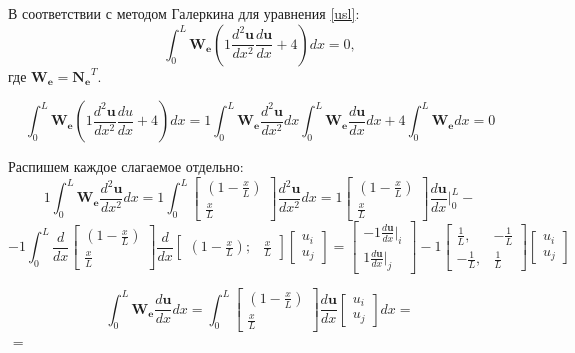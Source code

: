 В соответствии с методом Галеркина для уравнения \ref{usl}:
\begin{equation}\label{lin}
\int_0^L \mathbf{W_e}\left( 1\frac{d^2\mathbf{u}}{dx^2} \frac{d\mathbf{u}}{dx}  +4 \right) d x=0,
\end{equation}
где $\mathbf{W_e=N_e}^T$.

$$\int_0^L \mathbf{W_e}\left(1\frac{d^2\mathbf{u}}{dx^2} \frac{du}{dx}  +4 \right) d x= 1\int_0^L \mathbf{W_e} \frac{d^2 \mathbf{u}}{dx^2} dx   \int_0^L \mathbf{W_e}\frac{d\mathbf{u}}{dx} d x   +4 \int_0^L \mathbf{W_e} d x=0$$

Распишем каждое слагаемое отдельно:
$$
1\int_0^L \mathbf{W_e} \frac{d^2 \mathbf{u}}{dx^2} dx=1\int_0^L
	\begin{bmatrix}
	(1-\frac{x}{L}) \\
	\frac{x}{L}
	\end{bmatrix}
\frac{d^2 \mathbf{u}}{dx^2} dx =
1
	\begin{bmatrix}
	(1-\frac{x}{L}) \\
	\frac{x}{L}
	\end{bmatrix}
\frac{d\mathbf{u}}{dx} |_0^L -
$$
$$
  -1  \int_0^L
\frac{d}{dx}
	\begin{bmatrix}
	(1-\frac{x}{L}) \\
	\frac{x}{L}
	\end{bmatrix}
\frac{d}{dx}
	\begin{bmatrix}
	(1-\frac{x}{L}); & \frac{x}{L}
	\end{bmatrix}
	\begin{bmatrix}
	u_i \\
	u_j
	\end{bmatrix}
=
	\begin{bmatrix}
	  -1 \frac{d\mathbf{u}}{dx}|_i \\
1\frac{d\mathbf{u}}{dx}|_j
	\end{bmatrix}   -1 
\begin{bmatrix}
\frac{1}{L}, & -\frac{1}{L} \\
-\frac{1}{L}, & \frac{1}{L}
\end{bmatrix}
\begin{bmatrix}
u_i \\
u_j
\end{bmatrix}
$$

$$
 \int_0^L \mathbf{W_e} \frac{d \mathbf{u}}{dx} dx= \int_0^L
	\begin{bmatrix}
	(1-\frac{x}{L}) \\
	\frac{x}{L}
	\end{bmatrix}
\frac{d \mathbf{u}}{dx}
	\begin{bmatrix}
	u_i \\
	u_j
	\end{bmatrix}
dx
=
$$
$$
=
 
